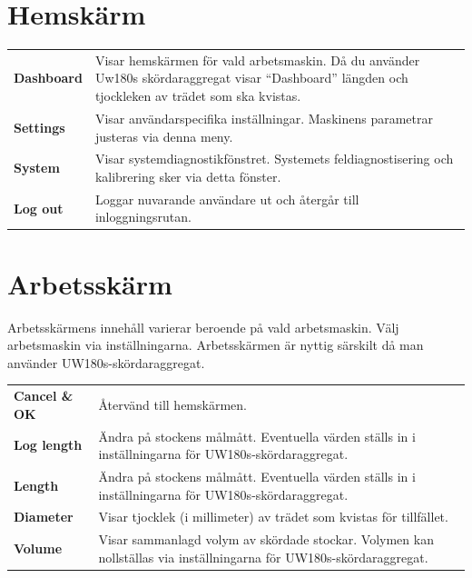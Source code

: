 \documentclass[12pt,a4paper,finnish]{uvmanual}
\begin{document}
\chapter{Hemskärm}\label{ch:home}


\begin{tabular}{ L{0.2\textwidth} L{0.66\textwidth} }
\textbf{Dashboard} & Visar hemskärmen för vald arbetsmaskin. Då du använder Uw180s skördaraggregat visar ``Dashboard'' längden och tjockleken av trädet som ska kvistas. \\
\textbf{Settings} & Visar användarspecifika inställningar. Maskinens parametrar justeras via denna meny.  \\
\textbf{System} & Visar systemdiagnostikfönstret. Systemets feldiagnostisering och kalibrering sker via detta fönster.  \\
\textbf{Log out} & Loggar nuvarande användare ut och återgår till inloggningsrutan.  \\
\end{tabular}



\chapter{Arbetsskärm}\label{ch:dashboard}

Arbetsskärmens innehåll varierar beroende på vald arbetsmaskin. Välj arbetsmaskin via inställningarna. Arbetsskärmen är nyttig särskilt då man använder UW180s-skördaraggregat.


\begin{tabular}{ L{0.2\textwidth} L{0.66\textwidth} }
\textbf{Cancel \& OK} & Återvänd till hemskärmen. \\
\textbf{Log length} & Ändra på stockens målmått. Eventuella värden ställs in i inställningarna för UW180s-skördaraggregat.\\
\textbf{Length} & Ändra på stockens målmått. Eventuella värden ställs in i inställningarna för UW180s-skördaraggregat. \\
\textbf{Diameter} & Visar tjocklek (i millimeter) av trädet som kvistas för tillfället.  \\
\textbf{Volume} & Visar sammanlagd volym av skördade stockar. Volymen kan nollställas via inställningarna för UW180s-skördaraggregat.  \\
\end{tabular}
\end{document}
